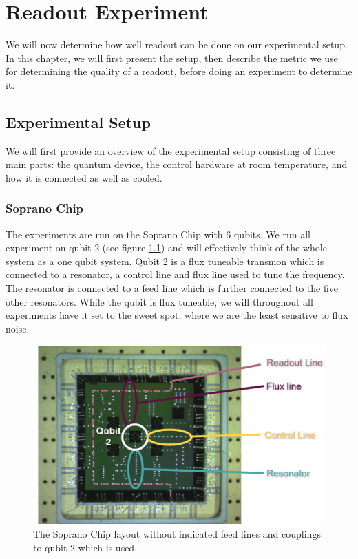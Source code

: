 \chapter{Readout Experiment}\label{chap:readout}
We will now determine how well readout can be done on our experimental setup. In this chapter, we will first present the setup, then describe the metric we use for determining the quality of a readout, before doing an experiment to determine it.

\section{Experimental Setup}
We will first provide an overview of the experimental setup consisting of three main parts: the quantum device, the control hardware at room temperature, and how it is connected as well as cooled.


\subsection{Soprano Chip}
The experiments are run on the Soprano Chip with 6 qubits. We run all experiment on qubit 2 (see figure \ref{fig:soprano}) and will effectively think of the whole system as a one qubit system. Qubit 2 is a flux tuneable transmon which is connected to a resonator, a control line and flux line used to tune the frequency. The resonator is connected to a feed line which is further connected to the five other resonators. While the qubit is flux tuneable, we will throughout all experiments have it set to the sweet spot,  where we are the least sensitive to flux noise. 

\begin{figure}[h]
    \centering
    \includegraphics[width = \textwidth]{Figs/hardware/qubit.png}
    \caption{The Soprano Chip layout without indicated feed lines and couplings to qubit 2 which is used.}
    \label{fig:soprano}
\end{figure}

